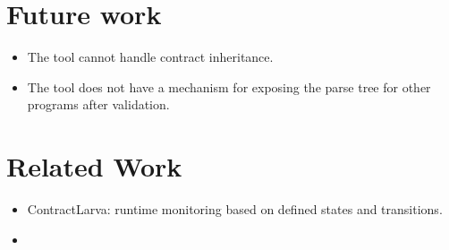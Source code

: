 \documentclass[a4paper]{article}
\begin{document}
\section{Future work}
\begin{itemize}
  \item The tool cannot handle contract inheritance.
  \item The tool does not have a mechanism for exposing the parse tree for other programs after validation.
\end{itemize}

\section{Related Work}
\begin{itemize}
  \item ContractLarva: runtime monitoring based on defined states and transitions.
  \item 
\end{itemize}
\end{document}
